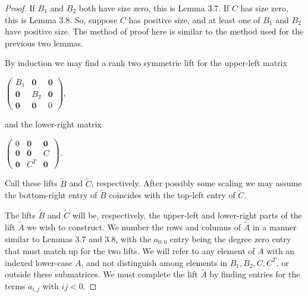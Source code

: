 \documentclass{article}
\begin{document}
\begin{proof}
  If $B_{1}$ and $B_{2}$ both have size zero, this is Lemma 3.7. If $C$ has size zero, this is Lemma 3.8. So, suppose $C$ has positive size, and at least one of $B_{1}$ and $B_{2}$ have positive size. The method of proof here is similar to the method used for the previous two lemmas. 
  
  By induction we may find a rank two symmetric lift for the upper-left matrix      
  \begin{center}  
    $\left(\begin{array}{ccc} B_{1} & \textbf{0} & \textbf{0} \\ \textbf{0} & B_{2} & \textbf{0} \\ \textbf{0} & \textbf{0} & 0 \end{array}\right)$,
  \end{center}
  and the lower-right matrix
  \begin{center}
      $\left(\begin{array}{ccc} 0 & \textbf{0} & \textbf{0} \\ \textbf{0} & \textbf{0} & C \\ \textbf{0} & C^{T} & \textbf{0} \end{array}\right)$.
  \end{center}
  Call these lifts $\tilde{B}$ and $\tilde{C}$, respectively. After possibly some scaling we may assume the bottom-right entry of $\tilde{B}$ coincides with the top-left entry of $\tilde{C}$.
  
  The lifts $\tilde{B}$ and $\tilde{C}$ will be, respectively, the upper-left and lower-right parts of the lift $\tilde{A}$ we wish to construct. We number the rows and columns of $\tilde{A}$ in a manner similar to Lemmas 3.7 and 3.8, with the $a_{0,0}$ entry being the degree zero entry that must match up for the two lifts. We will refer to any element of $A$ with an indexed lower-case $A$, and not distinguish among elements in $B_{1}, B_{2}, C, C^{T}$, or outside these submatrices. We must complete the lift $\tilde{A}$ by finding entries for the terms $a_{i,j}$ with $ij < 0$.
  

\end{proof}
\end{document}
